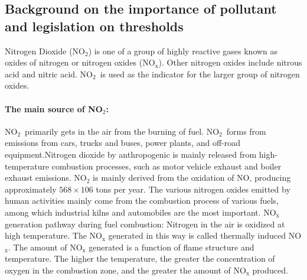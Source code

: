 \documentclass[a4paper,12pt,reqno]{article}
\begin{document}
\vspace{-0.5cm}
\subsection*{Background on the importance of pollutant and legislation on thresholds}
    Nitrogen Dioxide (NO$_2$) is one of a group of 
    highly reactive gases known as oxides of nitrogen 
    or nitrogen oxides (NO$_{\mathrm{x}}$). Other 
    nitrogen oxides include nitrous acid and nitric 
    acid. NO$_2$ is used as the indicator for the 
    larger group of nitrogen oxides. 
    \paragraph{The main source of NO$_2$:}
    NO$_2$ primarily gets in the air from the burning of fuel. 
    NO$_2$ forms from emissions from cars, trucks and buses, 
    power plants, and off-road equipment.Nitrogen dioxide by anthropogenic is mainly released 
    from high-temperature combustion processes, such as 
    motor vehicle exhaust and boiler exhaust emissions. NO$_2$ is mainly derived from the oxidation of NO, producing 
    approximately $568\times106$ tons per year. The various nitrogen 
    oxides emitted by human activities mainly come from the 
    combustion process of various fuels, among which industrial 
    kilns and automobiles are the most important. NO$_{\mathrm{x}}$ generation 
    pathway during fuel combustion: Nitrogen in the air is 
    oxidized at high temperature. The NO$_{\mathrm{x}}$ generated in this way 
    is called thermally induced NO$_{\mathrm{x}}$. The amount of NO$_{\mathrm{x}}$ generated 
    is a function of flame structure and temperature. The 
    higher the temperature, the greater the concentration of 
    oxygen in the combustion zone, and the greater the amount 
    of NO$_{\mathrm{x}}$ produced.
\end{document}

